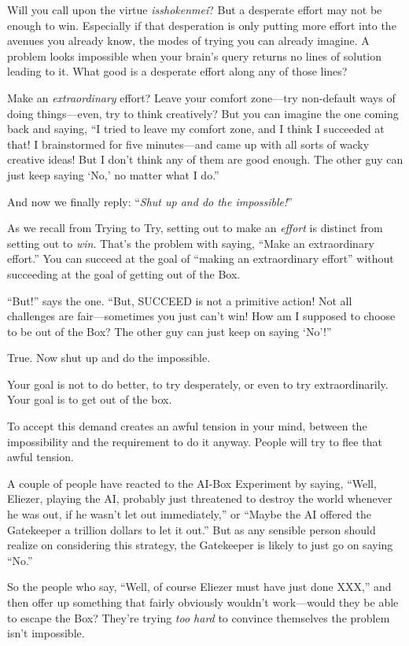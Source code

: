 {
 Will you call upon the virtue \textit{isshokenmei}? But a
desperate effort may not be enough to win. Especially if that
desperation is only putting more effort into the avenues you already
know, the modes of trying you can already imagine. A problem looks
impossible when your brain's query returns no lines of
solution leading to it. What good is a desperate effort along any of
those lines?}

{
 Make an \textit{extraordinary} effort? Leave your comfort
zone---try non-default ways of doing things---even, try to think
creatively? But you can imagine the one coming back and saying,
``I tried to leave my comfort zone, and I think I
succeeded at that! I brainstormed for five minutes---and came up with
all sorts of wacky creative ideas! But I don't think
any of them are good enough. The other guy can just keep saying
`No,' no matter what I
do.''}

{
 And now we finally reply: ``\textit{Shut up and
do the impossible!}''}

{
 As we recall from Trying to Try, setting out to make an
\textit{effort} is distinct from setting out to \textit{win}.
That's the problem with saying, ``Make
an extraordinary effort.'' You can succeed at the
goal of ``making an extraordinary
effort'' without succeeding at the goal of getting
out of the Box.}

{
 ``But!'' says the one.
``But, SUCCEED is not a primitive action! Not all
challenges are fair---sometimes you just can't win! How
am I supposed to choose to be out of the Box? The other guy can just
keep on saying
`No'!''}

{
 True. Now shut up and do the impossible.}

{
 Your goal is not to do better, to try desperately, or even to try
extraordinarily. Your goal is to get out of the box.}

{
 To accept this demand creates an awful tension in your mind,
between the impossibility and the requirement to do it anyway. People
will try to flee that awful tension.}

{
 A couple of people have reacted to the AI-Box Experiment by
saying, ``Well, Eliezer, playing the AI, probably just
threatened to destroy the world whenever he was out, if he
wasn't let out immediately,'' or
``Maybe the AI offered the Gatekeeper a trillion
dollars to let it out.'' But as any sensible person
should realize on considering this strategy, the Gatekeeper is likely
to just go on saying ``No.''}

{
 So the people who say, ``Well, of course Eliezer
must have just done XXX,'' and then offer up
something that fairly obviously wouldn't work---would
they be able to escape the Box? They're trying
\textit{too hard} to convince themselves the problem
isn't impossible.}

